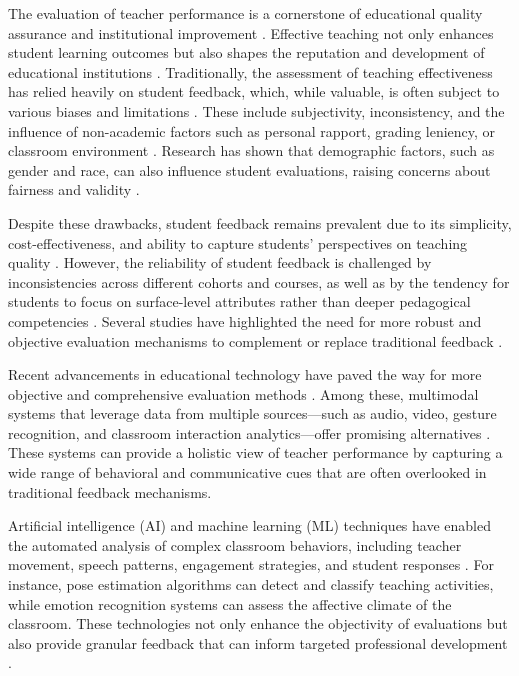 
The evaluation of teacher performance is a cornerstone of educational quality assurance and institutional improvement \cite{Heffernan2022}. Effective teaching not only enhances student learning outcomes but also shapes the reputation and development of educational institutions \cite{Ajmal2024}. Traditionally, the assessment of teaching effectiveness has relied heavily on student feedback, which, while valuable, is often subject to various biases and limitations \cite{Heffernan2022}. These include subjectivity, inconsistency, and the influence of non-academic factors such as personal rapport, grading leniency, or classroom environment \cite{Steinberg2021}. Research has shown that demographic factors, such as gender and race, can also influence student evaluations, raising concerns about fairness and validity \cite{Steinberg2021}.

Despite these drawbacks, student feedback remains prevalent due to its simplicity, cost-effectiveness, and ability to capture students' perspectives on teaching quality \cite{Ajmal2024}. However, the reliability of student feedback is challenged by inconsistencies across different cohorts and courses, as well as by the tendency for students to focus on surface-level attributes rather than deeper pedagogical competencies \cite{carvalho2022biases}. Several studies have highlighted the need for more robust and objective evaluation mechanisms to complement or replace traditional feedback \cite{Ginsburg2022NecessaryBI}.

Recent advancements in educational technology have paved the way for more objective and comprehensive evaluation methods \cite{Wang2022}. Among these, multimodal systems that leverage data from multiple sources—such as audio, video, gesture recognition, and classroom interaction analytics—offer promising alternatives \cite{10.1007/978-981-99-9109-9_7}. These systems can provide a holistic view of teacher performance by capturing a wide range of behavioral and communicative cues that are often overlooked in traditional feedback mechanisms.

Artificial intelligence (AI) and machine learning (ML) techniques have enabled the automated analysis of complex classroom behaviors, including teacher movement, speech patterns, engagement strategies, and student responses \cite{Wang2022}. For instance, pose estimation algorithms can detect and classify teaching activities, while emotion recognition systems can assess the affective climate of the classroom. These technologies not only enhance the objectivity of evaluations but also provide granular feedback that can inform targeted professional development \cite{YE2023108915}.

